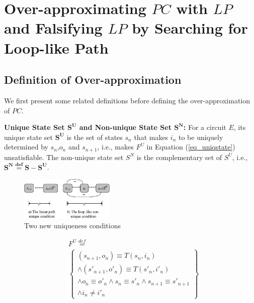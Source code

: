 \documentclass[journal]{IEEEtran}
\begin{document}
\section{Over-approximating $PC$ with $LP$ and Falsifying $LP$ by Searching for Loop-like Path}\label{sec_t2t3}

\subsection{Definition of Over-approximation}\label{subsec_loopdef}

We first present some related definitions before defining the over-approximation of $PC$.

\begin{definition11}\label{def_uniqstate}%
\textbf{Unique State Set $\boldsymbol{S^{U}}$ and Non-unique State Set $\boldsymbol{S^{N}}$:}
For a circuit $E$,
its unique state set $\boldsymbol{S^{U}}$ is the set of states $s_{n}$ that makes $i_n$ to be uniquely determined by $s_n$,$o_n$ and $s_{n+1}$,
i.e.,
makes $F^U$ in Equation (\ref{eq_uniqstate}) unsatisfiable.
The non-unique state set $S^{N}$ is the complementary set of $S^{U}$,
i.e.,
$\boldsymbol{S^{N}\overset{def}{=}S-S^{U}}$.
\end{definition11}

\begin{figure}[t]
\begin{center}
\includegraphics[width=0.4\textwidth]{t2t3}
\end{center}
\caption{Two new uniqueness conditions}
  \label{t2t3}
\end{figure}

\begin{equation}\label{eq_uniqstate}
\begin{split}
&F^U\overset{def}{=}\\
&\left\{
\begin{array}{c}
(s_{n+1},o_n)\equiv T(s_n,i_n)
\\
\wedge(s'_{n+1},o'_n)\equiv T(s'_n,i'_n)
\\
\wedge o_n\equiv o'_n\wedge s_n\equiv s'_n\wedge s_{n+1}\equiv s'_{n+1} \\
\wedge i_n\ne i'_n
\end{array}
\right\}
\end{split}
\end{equation}
%
\end{document}
